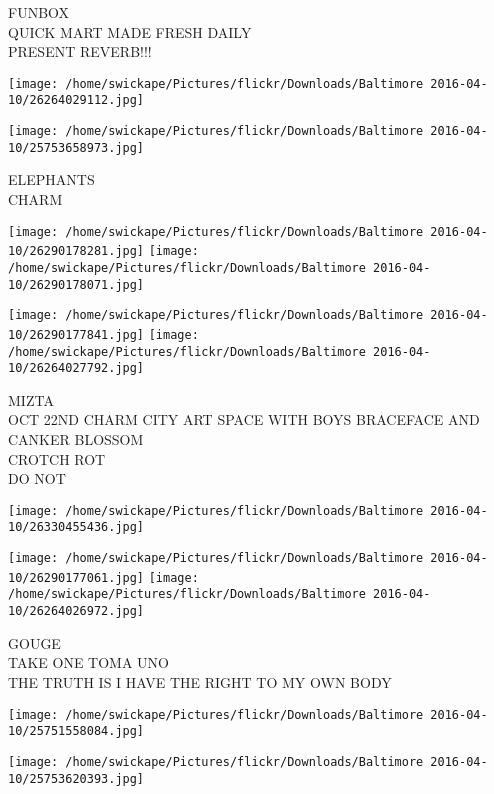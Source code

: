 \documentclass[10pt,letterpaper]{article}
\begin{document}
FUNBOX\\
QUICK MART MADE FRESH DAILY\\
PRESENT REVERB!!!\\
\pagebreak

\texttt{[image: /home/swickape/Pictures/flickr/Downloads/Baltimore 2016-04-10/26264029112.jpg]}

\vspace{0.25in}
\texttt{[image: /home/swickape/Pictures/flickr/Downloads/Baltimore 2016-04-10/25753658973.jpg]}

ELEPHANTS\\
CHARM\\
\pagebreak

\texttt{[image: /home/swickape/Pictures/flickr/Downloads/Baltimore 2016-04-10/26290178281.jpg]}
\texttt{[image: /home/swickape/Pictures/flickr/Downloads/Baltimore 2016-04-10/26290178071.jpg]}

\texttt{[image: /home/swickape/Pictures/flickr/Downloads/Baltimore 2016-04-10/26290177841.jpg]}
\texttt{[image: /home/swickape/Pictures/flickr/Downloads/Baltimore 2016-04-10/26264027792.jpg]}

MIZTA\\
OCT 22ND CHARM CITY ART SPACE WITH BOYS BRACEFACE AND CANKER BLOSSOM\\
CROTCH ROT\\
DO NOT\\
\pagebreak

\texttt{[image: /home/swickape/Pictures/flickr/Downloads/Baltimore 2016-04-10/26330455436.jpg]}

\vspace{0.25in}
\texttt{[image: /home/swickape/Pictures/flickr/Downloads/Baltimore 2016-04-10/26290177061.jpg]}
\texttt{[image: /home/swickape/Pictures/flickr/Downloads/Baltimore 2016-04-10/26264026972.jpg]}

GOUGE\\
TAKE ONE TOMA UNO\\
THE TRUTH IS I HAVE THE RIGHT TO MY OWN BODY\\
\pagebreak

\texttt{[image: /home/swickape/Pictures/flickr/Downloads/Baltimore 2016-04-10/25751558084.jpg]}

\vspace{0.25in}
\texttt{[image: /home/swickape/Pictures/flickr/Downloads/Baltimore 2016-04-10/25753620393.jpg]}
\end{document}
